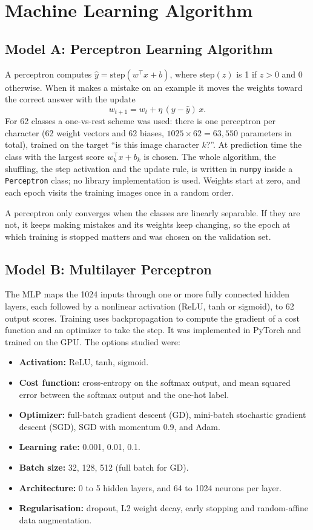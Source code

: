 \documentclass[12pt,a4paper]{article}
\begin{document}
\section{Machine Learning Algorithm}

\subsection*{Model A: Perceptron Learning Algorithm}
A perceptron computes $\hat{y} = \text{step}(w^{\top}x + b)$, where $\text{step}(z)$ is 1 if
$z > 0$ and 0 otherwise. When it makes a mistake on an example it moves the weights toward the
correct answer with the update
\[
w_{t+1} = w_t + \eta\,(y - \hat{y})\,x .
\]
For 62 classes a one-vs-rest scheme was used: there is one perceptron per character (62 weight
vectors and 62 biases, $1025 \times 62 = 63{,}550$ parameters in total), trained on the target
``is this image character $k$?''. At prediction time the class with the largest score
$w_k^{\top}x + b_k$ is chosen. The whole algorithm, the shuffling, the step activation and the
update rule, is written in \texttt{numpy} inside a \texttt{Perceptron} class; no library
implementation is used. Weights start at zero, and each epoch visits the training images once in
a random order.

A perceptron only converges when the classes are linearly separable. If they are not, it keeps
making mistakes and its weights keep changing, so the epoch at which training is stopped matters
and was chosen on the validation set.

\subsection*{Model B: Multilayer Perceptron}
The MLP maps the 1024 inputs through one or more fully connected hidden layers, each followed by a
nonlinear activation (ReLU, tanh or sigmoid), to 62 output scores. Training uses backpropagation
to compute the gradient of a cost function and an optimizer to take the step. It was implemented
in PyTorch and trained on the GPU. The options studied were:
\begin{itemize}
\item \textbf{Activation:} ReLU, tanh, sigmoid.
\item \textbf{Cost function:} cross-entropy on the softmax output, and mean squared error between
the softmax output and the one-hot label.
\item \textbf{Optimizer:} full-batch gradient descent (GD), mini-batch stochastic gradient descent
(SGD), SGD with momentum 0.9, and Adam.
\item \textbf{Learning rate:} 0.001, 0.01, 0.1.
\item \textbf{Batch size:} 32, 128, 512 (full batch for GD).
\item \textbf{Architecture:} 0 to 5 hidden layers, and 64 to 1024 neurons per layer.
\item \textbf{Regularisation:} dropout, L2 weight decay, early stopping and random-affine data
augmentation.
\end{itemize}
\end{document}
